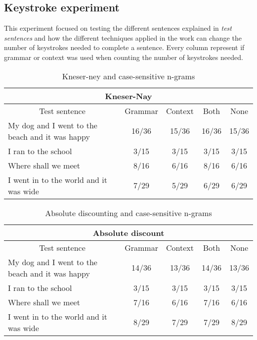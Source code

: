 \subsection{Keystroke experiment}
This experiment focused on testing the different sentences explained in \emph{test sentences} and how the different techniques applied in the work can change the number of keystrokes needed to complete a sentence. Every column represent if grammar or context was used when counting the number of keystrokes needed.

\begin{table}[H]
\centering
\caption{Kneser-ney and case-sensitive n-grams}
{\scriptsize
\begin{tabular}{ |p{}|c|c|c|c| }

	\hline
	\multicolumn{5}{|c|}{Kneser-Nay} \\
	\hline
	\multicolumn{1}{|c|}{Test sentence} & Grammar & Context & Both & None \\
	\hline
	My dog and I went to the beach and it was happy & 16/36 & 15/36 & 16/36 & 15/36 \\
	\hline
	I ran to the school & 3/15 & 3/15 & 3/15 & 3/15 \\
	\hline
	Where shall we meet & 8/16 & 6/16 & 8/16 & 6/16 \\
	\hline
	I went in to the world and it was wide & 7/29 & 5/29 & 6/29 & 6/29 \\
	\hline
\end{tabular}
}
\end{table}

\vspace{-1cm}
\begin{table}[H]
\centering
\caption{Absolute discounting and case-sensitive n-grams}
{\scriptsize
\begin{tabular}{ |p{}|c|c|c|c| }
	\hline
	\multicolumn{5}{|c|}{Absolute discount} \\
	\hline
	\multicolumn{1}{|c|}{Test sentence} & Grammar & Context & Both & None \\
	\hline
	My dog and I went to the beach and it was happy & 14/36 & 13/36 & 14/36 & 13/36 \\
	\hline
	I ran to the school & 3/15 & 3/15 & 3/15 & 3/15 \\
	\hline
	Where shall we meet & 7/16 & 6/16 & 7/16 & 6/16 \\
	\hline
	I went in to the world and it was wide & 8/29 & 7/29 & 7/29 & 8/29 \\
	\hline
\end{tabular}
}
\end{table}

